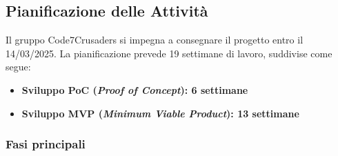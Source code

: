 \documentclass{article}
\begin{document}
    \subsection{Pianificazione delle Attività}
        Il gruppo Code7Crusaders
        si impegna a consegnare il progetto entro il 14/03/2025. La pianificazione prevede
        19 settimane di lavoro, suddivise come segue:
        \begin{itemize}
            \item \textbf{Sviluppo PoC (\textit{Proof of Concept}): 6 settimane}
            \item \textbf{Sviluppo MVP (\textit{Minimum Viable Product}): 13 settimane}
        \end{itemize}

        \subsubsection{Fasi principali}  %
\end{document}
